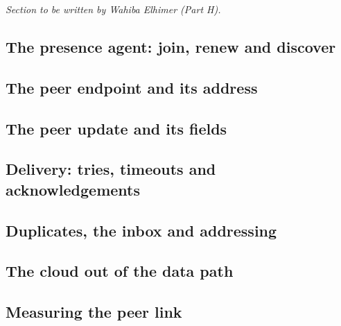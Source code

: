 
\tbd{} \emph{Section to be written by Wahiba Elhimer (Part H).}

\subsection{The presence agent: join, renew and discover}

\subsection{The peer endpoint and its address}

\subsection{The peer update and its fields}

\subsection{Delivery: tries, timeouts and acknowledgements}

\subsection{Duplicates, the inbox and addressing}

\subsection{The cloud out of the data path}

\subsection{Measuring the peer link}
